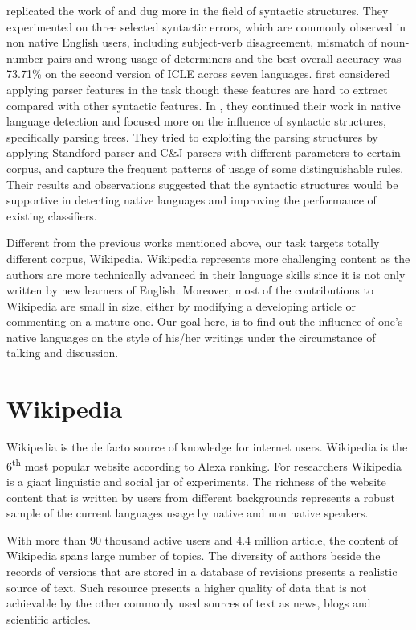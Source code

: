 \documentclass[11pt]{article}
\begin{document}
\cite {wong2009contrastive} replicated the work of \cite
{koppel2005automatically} and dug more in the field of syntactic structures.
They experimented on three selected syntactic errors, which are commonly
observed in non native English users, including subject-verb disagreement,
mismatch of noun-number pairs and wrong usage of determiners and the best
overall accuracy was 73.71\% on the second version of ICLE across seven
languages. \cite{wong2010parser} first considered applying parser features in
the task though these features are hard to extract compared with other
syntactic features. In \cite {wong-dras:2011:EMNLP}, they continued their
work in native language detection and focused more on the influence of
syntactic structures, specifically parsing trees. They tried to exploiting the
parsing structures by applying Standford parser and C\&J parsers with different
parameters to certain corpus, and capture the frequent patterns of usage of some
distinguishable rules. Their results and observations suggested that the
syntactic structures would be supportive in detecting native languages and
improving the performance of existing classifiers.

Different from the previous works mentioned above, our task targets totally
different corpus, Wikipedia. Wikipedia represents more challenging content as the
authors are more technically advanced in their language skills since it is not only written by
new learners of English. Moreover, most of the contributions to Wikipedia are
small in size, either by modifying a developing article or commenting on
a mature one. Our goal here, is to find out the influence of one's native
languages on the style of his/her writings under the circumstance of talking and
discussion.

\section{Wikipedia}
\label{wiki}
Wikipedia is the de facto source of knowledge for internet users. Wikipedia is
the 6\textsuperscript{th} most popular website according to Alexa ranking.
For researchers Wikipedia is a giant linguistic and social jar of experiments.
The richness of the website content that is written by users from different backgrounds represents a robust sample of the current languages usage by native and non native speakers.

With more than 90 thousand active users and 4.4 million article, the content of Wikipedia spans large number of topics. The diversity of authors beside the records of versions that are stored in a database of revisions presents a realistic source of text. Such resource presents a higher quality of data that is not achievable by the other commonly used sources of text as news, blogs and scientific articles.
\end{document}
